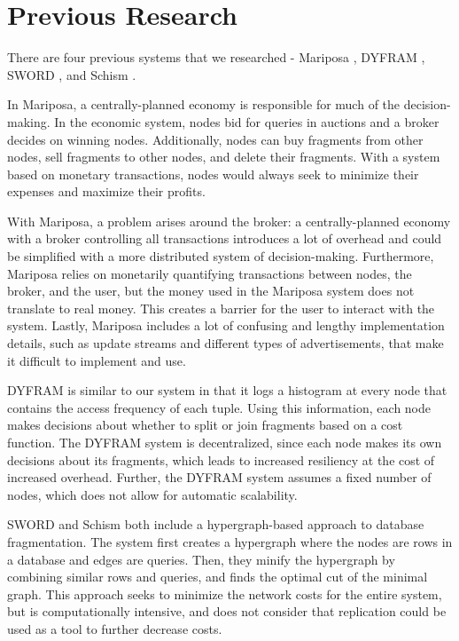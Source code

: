 \documentclass{brandiss}
\numberwithin{section}{chapter}
\numberwithin{figure}{chapter}
\theoremstyle{definition}
\theoremstyle{plain}
\theoremstyle{remark}
\begin{document}
\section{Previous Research}

There are four previous systems that we researched - Mariposa \cite{mariposa}, DYFRAM \cite{dyfram}, SWORD \cite{sword}, and Schism \cite{schism}.

In Mariposa, a centrally-planned economy is responsible for much of the decision-making. In the economic system, nodes bid for queries in auctions and a broker decides on winning nodes. Additionally, nodes can buy fragments from other nodes, sell fragments to other nodes, and delete their fragments. With a system based on monetary transactions, nodes would always seek to minimize their expenses and maximize their profits.

With Mariposa, a problem arises around the broker: a centrally-planned economy with a broker controlling all transactions introduces a lot of overhead and could be simplified with a more distributed system of decision-making. Furthermore, Mariposa relies on monetarily quantifying transactions between nodes, the broker, and the user, but the money used in the Mariposa system does not translate to real money. This creates a barrier for the user to interact with the system. Lastly, Mariposa includes a lot of confusing and lengthy implementation details, such as update streams and different types of advertisements, that make it difficult to implement and use.

DYFRAM is similar to our system in that it logs a histogram at every node that contains the access frequency of each tuple. Using this information, each node makes decisions about whether to split or join fragments based on a cost function. The DYFRAM system is decentralized, since each node makes its own decisions about its fragments, which leads to increased resiliency at the cost of increased overhead. Further, the DYFRAM system assumes a fixed number of nodes, which does not allow for automatic scalability.

SWORD and Schism both include a hypergraph-based approach to database fragmentation. The system first creates a hypergraph where the nodes are rows in a database and edges are queries. Then, they minify the hypergraph by combining similar rows and queries, and finds the optimal cut of the minimal graph. This approach seeks to minimize the network costs for the entire system, but is computationally intensive, and does not consider that replication could be used as a tool to further decrease costs.
\end{document}
